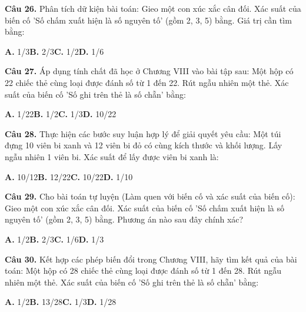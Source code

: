 \documentclass[11pt,a4paper]{article}
\begin{document}
\textbf{\color{primary} Câu 26.} Phân tích dữ kiện bài toán: Gieo một con xúc xắc cân đối. Xác suất của biến cố 'Số chấm xuất hiện là số nguyên tố' (gồm 2, 3, 5) bằng. Giá trị cần tìm bằng:\par
\hspace*{1.5em}\textbf{A.} 1/3\quad\quad \textbf{B.} 2/3\quad\quad \textbf{C.} 1/2\quad\quad \textbf{D.} 1/6\par\vspace{2pt}
\textbf{\color{primary} Câu 27.} Áp dụng tính chất đã học ở Chương VIII vào bài tập sau: Một hộp có 22 chiếc thẻ cùng loại được đánh số từ 1 đến 22. Rút ngẫu nhiên một thẻ. Xác suất của biến cố 'Số ghi trên thẻ là số chẵn' bằng:\par
\hspace*{1.5em}\textbf{A.} 1/22\quad\quad \textbf{B.} 1/2\quad\quad \textbf{C.} 1/3\quad\quad \textbf{D.} 10/22\par\vspace{2pt}
\textbf{\color{primary} Câu 28.} Thực hiện các bước suy luận hợp lý để giải quyết yêu cầu: Một túi đựng 10 viên bi xanh và 12 viên bi đỏ có cùng kích thước và khối lượng. Lấy ngẫu nhiên 1 viên bi. Xác suất để lấy được viên bi xanh là:\par
\hspace*{1.5em}\textbf{A.} 10/12\quad\quad \textbf{B.} 12/22\quad\quad \textbf{C.} 10/22\quad\quad \textbf{D.} 1/10\par\vspace{2pt}
\textbf{\color{primary} Câu 29.} Cho bài toán tự luyện (Làm quen với biến cố và xác suất của biến cố): Gieo một con xúc xắc cân đối. Xác suất của biến cố 'Số chấm xuất hiện là số nguyên tố' (gồm 2, 3, 5) bằng. Phương án nào sau đây chính xác?\par
\hspace*{1.5em}\textbf{A.} 1/2\quad\quad \textbf{B.} 2/3\quad\quad \textbf{C.} 1/6\quad\quad \textbf{D.} 1/3\par\vspace{2pt}
\textbf{\color{primary} Câu 30.} Kết hợp các phép biến đổi trong Chương VIII, hãy tìm kết quả của bài toán: Một hộp có 28 chiếc thẻ cùng loại được đánh số từ 1 đến 28. Rút ngẫu nhiên một thẻ. Xác suất của biến cố 'Số ghi trên thẻ là số chẵn' bằng:\par
\hspace*{1.5em}\textbf{A.} 1/2\quad\quad \textbf{B.} 13/28\quad\quad \textbf{C.} 1/3\quad\quad \textbf{D.} 1/28\par\vspace{2pt}
\end{document}
